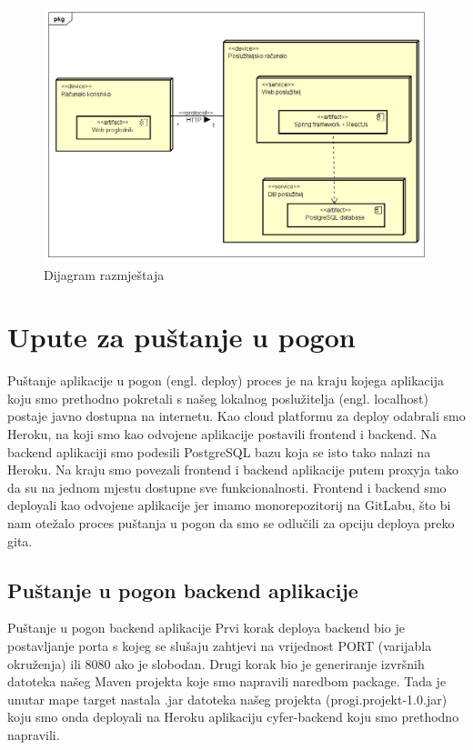 			~\\
			\begin{figure}[H]
				\hspace{-0.4in}
				\includegraphics[scale=0.65]{dijagrami/Dijagram razmjestaja.png} %
				\caption{Dijagram razmještaja}
				\centering
			\end{figure}
			
			
			\eject 
		
		\section{Upute za puštanje u pogon}
		
		Puštanje aplikacije u pogon (engl. deploy) proces je na kraju kojega aplikacija koju smo prethodno pokretali s našeg lokalnog poslužitelja (engl. localhost) postaje javno dostupna na internetu. Kao cloud platformu za deploy odabrali smo Heroku, na koji smo kao odvojene aplikacije postavili frontend i backend. Na backend aplikaciji smo podesili PostgreSQL bazu koja se isto tako nalazi na Heroku. Na kraju smo povezali frontend i backend aplikacije putem proxyja tako da su na jednom mjestu dostupne sve funkcionalnosti.
		Frontend i backend smo deployali kao odvojene aplikacije jer imamo monorepozitorij na GitLabu, što bi nam otežalo proces puštanja u pogon da smo se odlučili za opciju deploya preko gita.\par
		
		\subsection{Puštanje u pogon backend aplikacije}
		Puštanje u pogon backend aplikacije
		Prvi korak deploya backend bio je postavljanje porta s kojeg se slušaju zahtjevi na vrijednost PORT (varijabla okruženja) ili 8080 ako je slobodan.
		Drugi korak bio je generiranje izvršnih datoteka našeg Maven projekta koje smo napravili naredbom package. Tada je unutar mape target nastala .jar datoteka našeg projekta (progi.projekt-1.0.jar) koju smo onda deployali na Heroku aplikaciju cyfer-backend koju smo prethodno napravili.\par
		
